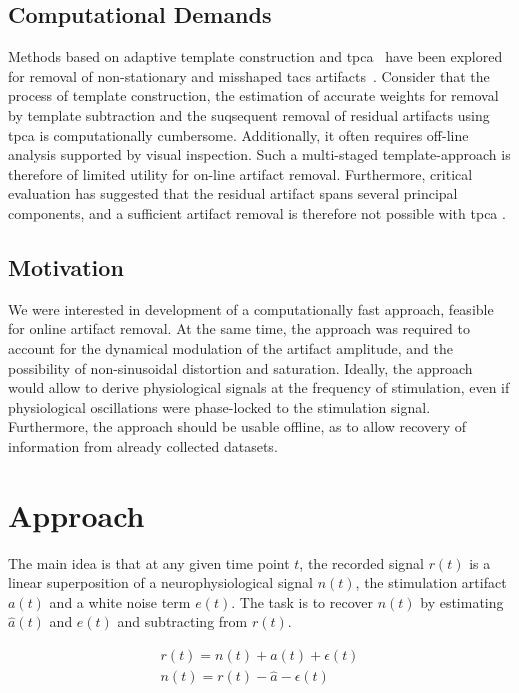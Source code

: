 \documentclass[a4paper]{article}
\begin{document}
\subsection{Computational Demands}

Methods based on adaptive template construction and \gls{tpca}~\citep{Niazy_2005} have been explored for removal of  non-stationary and misshaped \gls{tacs} artifacts~\citep{Helfrich_2014}.  Consider that the process of template construction, the estimation of accurate weights for removal by template subtraction and the suqsequent removal of residual artifacts using \gls{tpca} is computationally cumbersome. Additionally, it often requires off-line analysis supported by visual inspection.
Such a multi-staged template-approach is therefore of limited utility for on-line artifact removal. Furthermore, critical evaluation has suggested that the residual artifact spans several principal components, and a sufficient artifact removal is therefore not possible with \gls{tpca} \citep{Noury_2016}.

\subsection{Motivation}

We were interested in development of a computationally fast approach, feasible for online artifact removal. At the same time, the approach was required to account for the dynamical modulation of the artifact amplitude, and the possibility of non-sinusoidal distortion and saturation. Ideally, the approach would allow to derive physiological signals at the frequency of stimulation, even if physiological oscillations were phase-locked to the stimulation signal.
Furthermore, the approach should be usable offline, as to allow recovery of information from already collected datasets.

\section{Approach}

The main idea is that at any given time point $t$, the recorded signal $r(t)$ is a linear super\-position of a neurophysiological signal $n(t)$, the stimulation artifact $a(t)$ and a white noise term $e(t)$. The task is to recover $n(t)$ by estimating $\hat{a}(t)$ and $e(t)$ and subtracting from $r(t)$.

\begin{eqnarray}
    r(t) = n(t) + a(t) + \epsilon(t)\\
    n(t) = r(t) - \hat{a} - \epsilon(t)
\end{eqnarray}
\end{document}
